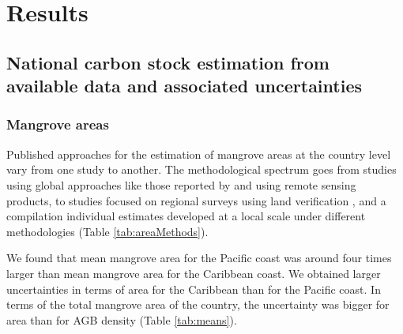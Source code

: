 \documentclass[review, authoryear]{elsarticle}   	%
\begin{document}
\section{Results}

\subsection{National carbon stock estimation from available data and associated uncertainties}
\subsubsection{Mangrove areas}
Published approaches for the estimation of mangrove areas at the country level vary from one study to another. The methodological spectrum goes from studies using global approaches like those reported by  \citet{Giri2013, Giri2010} and  \citet{CONL:CONL12060} using remote sensing products,  to studies focused on regional surveys using land verification  \citep{FAO2007}, and a compilation individual estimates developed at a local scale under different methodologies \citet{INVEMAR2014} (Table \ref{tab:areaMethods}). 

We found that mean mangrove area for the Pacific coast was around four times larger than mean mangrove area for the Caribbean coast. We obtained larger uncertainties in terms of area for the Caribbean than for the Pacific coast. In terms of the total mangrove area of the country, the uncertainty was bigger for area than for AGB density (Table \ref{tab:means}).
\end{document}
